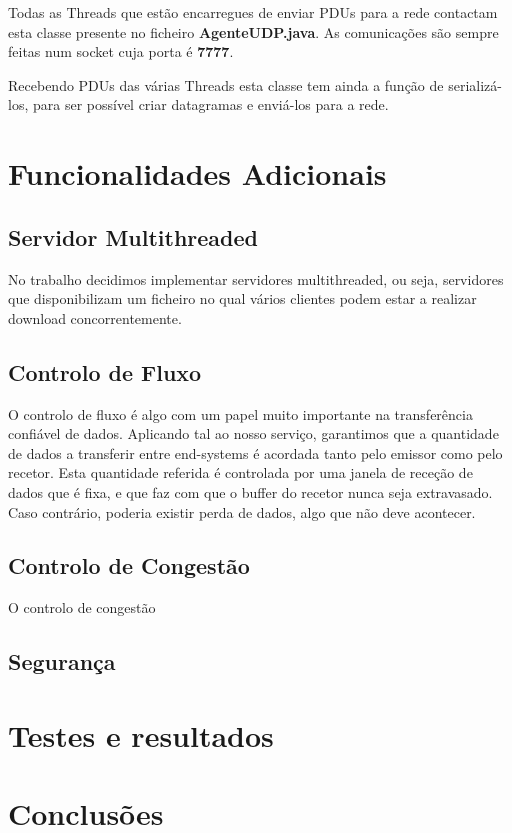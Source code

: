 \documentclass{llncs}
\begin{document}
Todas as Threads que estão encarregues de enviar PDUs para a rede contactam esta classe presente no ficheiro \textbf{AgenteUDP.java}. As comunicações são sempre feitas num socket cuja porta é \textbf{7777}.

Recebendo PDUs das várias Threads esta classe tem ainda a função de serializá-los, para ser possível criar datagramas e enviá-los para a rede.


\section{Funcionalidades Adicionais}

\subsection{Servidor Multithreaded}
No trabalho decidimos implementar servidores multithreaded, ou seja, servidores que disponibilizam um ficheiro no qual vários clientes podem estar a realizar download concorrentemente.

\subsection{Controlo de Fluxo}
O controlo de fluxo é algo com um papel muito importante na transferência confiável de dados. Aplicando tal ao nosso serviço, garantimos que a quantidade de dados a transferir entre end-systems é acordada tanto pelo emissor como pelo recetor. Esta quantidade referida é controlada por uma janela de receção de dados que é fixa, e que faz com que o buffer do recetor nunca seja extravasado. Caso contrário, poderia existir perda de dados, algo que não deve acontecer.

\subsection{Controlo de Congestão}
O controlo de congestão

\subsection{Segurança}



\section{Testes e resultados}



\section{Conclusões}
\end{document}
